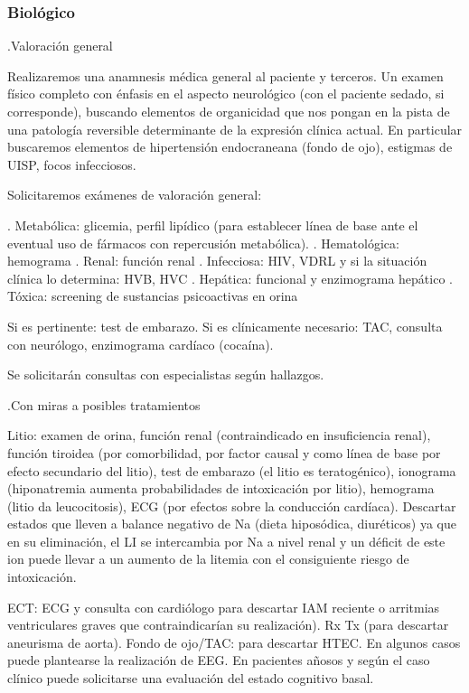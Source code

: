 \subsubsection*{Biológico}
.Valoración general

Realizaremos una anamnesis médica general al paciente y terceros. Un examen físico completo con énfasis en el aspecto neurológico (con el paciente sedado, si corresponde), buscando elementos de organicidad que nos pongan en la pista de una patología reversible determinante de la expresión clínica actual. En particular buscaremos elementos de hipertensión endocraneana (fondo de ojo), estigmas de UISP, focos infecciosos.

Solicitaremos exámenes de valoración general:

. Metabólica: glicemia, perfil lipídico (para establecer línea de base ante el eventual uso de fármacos con repercusión metabólica).
. Hematológica: hemograma
. Renal: función renal
. Infecciosa: HIV, VDRL y si la situación clínica lo determina: HVB, HVC
. Hepática: funcional y enzimograma hepático
. Tóxica: screening de sustancias psicoactivas en orina

Si es pertinente: test de embarazo.
Si es clínicamente necesario: TAC, consulta con neurólogo, enzimograma cardíaco (cocaína).

Se solicitarán consultas con especialistas según hallazgos.

.Con miras a posibles tratamientos

Litio: examen de orina, función renal (contraindicado en insuficiencia renal), función tiroidea (por comorbilidad, por factor causal y como línea de base por efecto secundario del litio), test de embarazo (el litio es teratogénico), ionograma (hiponatremia aumenta probabilidades de intoxicación por litio), hemograma (litio da leucocitosis), ECG (por efectos sobre la conducción cardíaca). Descartar estados que lleven a balance negativo de Na (dieta hiposódica, diuréticos) ya que en su eliminación, el LI se intercambia por Na a nivel renal y un déficit de este ion puede llevar a un aumento de la litemia con el consiguiente riesgo de intoxicación.

ECT: ECG y consulta con cardiólogo para descartar IAM reciente o arritmias ventriculares graves que contraindicarían su realización). Rx Tx (para descartar aneurisma de aorta). Fondo de ojo/TAC: para descartar HTEC. En algunos casos puede plantearse la realización de EEG. En pacientes añosos y según el caso clínico puede solicitarse una evaluación del estado cognitivo basal.

